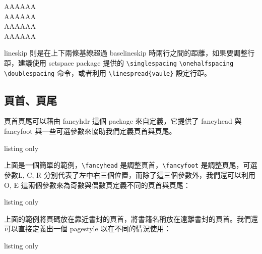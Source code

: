\linespread{1}\selectfont
\begin{tcolorbox}
{\setlength{\baselineskip}{12pt}\selectfont
AAAAAA\\
AAAAAA\\}
{\setlength{\baselineskip}{24pt}\selectfont
AAAAAA\\
AAAAAA\\}
\end{tcolorbox}
\linespread{1.5}\selectfont

lineskip 則是在上下兩條基線超過 baselineskip 時兩行之間的距離，如果要調整行距，建議使用 setspace package 提供的 \verb|\singlespacing| \verb|\onehalfspacing| \verb|\doublespacing| 命令，或者利用 \verb|\linespread{vaule}| 設定行距。

\subsection{頁首、頁尾}

頁首頁尾可以藉由 fancyhdr 這個 package 來自定義，它提供了 fancyhead 與fancyfoot 與一些可選參數來協助我們定義頁首與頁尾。

\begin{tcblisting}{listing only}
\usepackage{fancyhdr}
\pagestyle{fancy}
\fancyhead[L,C,R]{ }%
\fancyfoot[L,C,R]{ }
\fancyhead[R]{\thepage}%
\renewcommand{\headrulewidth}{0.4pt}%
\end{tcblisting}

上面是一個簡單的範例，\verb|\fancyhead| 是調整頁首，\verb|\fancyfoot| 是調整頁尾，可選參數L, C, R 分別代表了左中右三個位置，而除了這三個參數外，我們還可以利用 O, E 這兩個參數來為奇數與偶數頁定義不同的頁首與頁尾：

\begin{tcblisting}{listing only}
\pagestyle{fancy}
\fancyhead[L,C,R]{ }%
\fancyfoot[L,C,R]{ }
\fancyhead[RO,LE]{\thepage}
\renewcommand{\headrulewidth}{0.4pt}%
\end{tcblisting}

上面的範例將頁碼放在靠近書封的頁首，將書籍名稱放在遠離書封的頁首。我們還可以直接定義出一個 pagestyle 以在不同的情況使用：

\begin{tcblisting}{listing only}
\pagestyle{name}%
\end{tcblisting}

